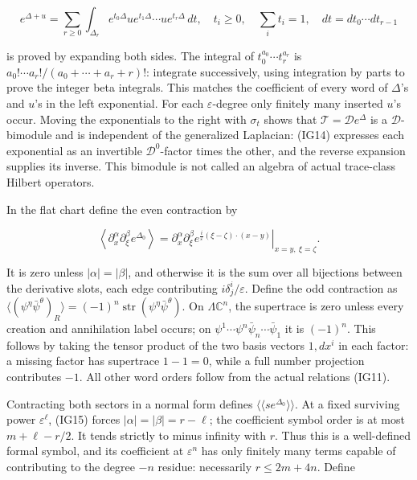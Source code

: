 \documentclass[
  11pt,
]{article}
\begin{document}
\[
 e^{\Delta+u}=\sum_{r\geq0}\int_{\Delta_r}
       e^{t_0\Delta}u e^{t_1\Delta}\cdots u e^{t_r\Delta}\,dt,
 \quad t_i\geq0,\quad\sum_i t_i=1,
 \quad dt=dt_0\cdots dt_{r-1}
\tag{IG14}
\]

is proved by expanding both sides. The integral of
\(t_0^{a_0}\cdots t_r^{a_r}\) is
\(a_0!\cdots a_r!/(a_0+\cdots+a_r+r)!\): integrate successively, using
integration by parts to prove the integer beta integrals. This matches
the coefficient of every word of \(\Delta\)'s and \(u\)'s in the left
exponential. For each \(\varepsilon\)-degree only finitely many inserted
\(u\)'s occur. Moving the exponentials to the right with \(\sigma_t\)
shows that \(\mathcal T=\mathcal D e^\Delta\) is a
\(\mathcal D\)-bimodule and is independent of the generalized Laplacian:
(IG14) expresses each exponential as an invertible
\(\mathcal D^0\)-factor times the other, and the reverse expansion
supplies its inverse. This bimodule is not called an algebra of actual
trace-class Hilbert operators.

In the flat chart define the even contraction by

\[
 \left\langle\partial_x^\alpha\partial_\xi^\beta
                     e^{\Delta_0}\right\rangle
 =\left.\partial_x^\alpha\partial_\xi^\beta
 e^{\frac{i}{\varepsilon}(\xi-\zeta)\cdot(x-y)}
                    \right|_{x=y,\ \xi=\zeta}.
\tag{IG15}
\]

It is zero unless \(|\alpha|=|\beta|\), and otherwise it is the sum over
all bijections between the derivative slots, each edge contributing
\(i\delta^i_j/\varepsilon\). Define the odd contraction as
\(\langle(\psi^\eta\bar\psi^\theta)_R\rangle=(-1)^n\operatorname{str}(\psi^\eta\bar\psi^\theta)\).
On \(\Lambda\mathbb C^n\), the supertrace is zero unless every creation
and annihilation label occurs; on
\(\psi^1\cdots\psi^n\bar\psi_n\cdots\bar\psi_1\) it is \((-1)^n\). This
follows by taking the tensor product of the two basis vectors \(1,dx^i\)
in each factor: a missing factor has supertrace \(1-1=0\), while a full
number projection contributes \(-1\). All other word orders follow from
the actual relations (IG11).

Contracting both sectors in a normal form defines
\(\langle\!\langle se^{\Delta_0}\rangle\!\rangle\). At a fixed surviving
power \(\varepsilon^\ell\), (IG15) forces \(|\alpha|=|\beta|=r-\ell\);
the coefficient symbol order is at most \(m+\ell-r/2\). It tends
strictly to minus infinity with \(r\). Thus this is a well-defined
formal symbol, and its coefficient at \(\varepsilon^n\) has only
finitely many terms capable of contributing to the degree \(-n\)
residue: necessarily \(r\leq2m+4n\). Define
\end{document}
